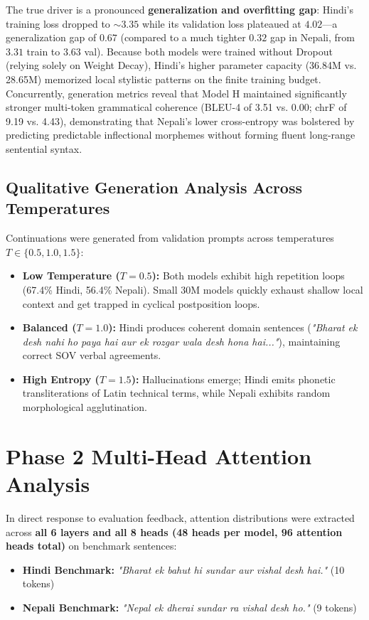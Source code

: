 \documentclass[10pt,a4paper]{article}
\begin{document}
The true driver is a pronounced \textbf{generalization and overfitting gap}: Hindi's training loss dropped to $\sim 3.35$ while its validation loss plateaued at $4.02$---a generalization gap of $\mathbf{0.67}$ (compared to a much tighter $\mathbf{0.32}$ gap in Nepali, from $3.31$ train to $3.63$ val). Because both models were trained without Dropout (relying solely on Weight Decay), Hindi's higher parameter capacity (36.84M vs. 28.65M) memorized local stylistic patterns on the finite training budget. Concurrently, generation metrics reveal that Model H maintained significantly stronger multi-token grammatical coherence (BLEU-4 of 3.51 vs. 0.00; chrF of 9.19 vs. 4.43), demonstrating that Nepali's lower cross-entropy was bolstered by predicting predictable inflectional morphemes without forming fluent long-range sentential syntax.

\subsection{Qualitative Generation Analysis Across Temperatures}
Continuations were generated from validation prompts across temperatures $T \in \{0.5, 1.0, 1.5\}$:
\begin{itemize}[noitemsep,leftmargin=*]
    \item \textbf{Low Temperature ($T=0.5$):} Both models exhibit high repetition loops (67.4\% Hindi, 56.4\% Nepali). Small 30M models quickly exhaust shallow local context and get trapped in cyclical postposition loops.
    \item \textbf{Balanced ($T=1.0$):} Hindi produces coherent domain sentences (\textit{"Bharat ek desh nahi ho paya hai aur ek rozgar wala desh hona hai..."}), maintaining correct SOV verbal agreements.
    \item \textbf{High Entropy ($T=1.5$):} Hallucinations emerge; Hindi emits phonetic transliterations of Latin technical terms, while Nepali exhibits random morphological agglutination.
\end{itemize}

\section{Phase 2 Multi-Head Attention Analysis}

In direct response to evaluation feedback, attention distributions were extracted across \textbf{all 6 layers and all 8 heads (48 heads per model, 96 attention heads total)} on benchmark sentences:
\begin{itemize}[noitemsep,leftmargin=*]
    \item \textbf{Hindi Benchmark:} \textit{"Bharat ek bahut hi sundar aur vishal desh hai."} (10 tokens)
    \item \textbf{Nepali Benchmark:} \textit{"Nepal ek dherai sundar ra vishal desh ho."} (9 tokens)
\end{itemize}
\end{document}
